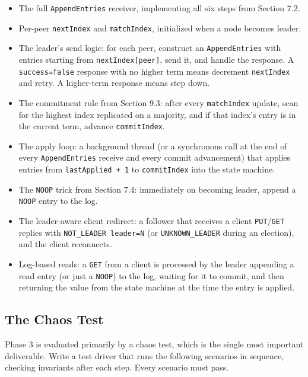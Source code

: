 \documentclass[11pt,a4paper]{article}
\begin{document}
\begin{itemize}
\item The full \texttt{AppendEntries} receiver, implementing all six steps from Section 7.2.

\item Per-peer \texttt{nextIndex} and \texttt{matchIndex}, initialized when a node becomes leader.

\item The leader's send logic: for each peer, construct an \texttt{AppendEntries} with entries starting from \texttt{nextIndex[peer]}, send it, and handle the response. A \texttt{success=false} response with no higher term means decrement \texttt{nextIndex} and retry. A higher-term response means step down.

\item The commitment rule from Section 9.3: after every \texttt{matchIndex} update, scan for the highest index replicated on a majority, and if that index's entry is in the current term, advance \texttt{commitIndex}.

\item The apply loop: a background thread (or a synchronous call at the end of every \texttt{AppendEntries} receive and every commit advancement) that applies entries from \texttt{lastApplied + 1} to \texttt{commitIndex} into the state machine.

\item The \texttt{NOOP} trick from Section 7.4: immediately on becoming leader, append a \texttt{NOOP} entry to the log.

\item The leader-aware client redirect: a follower that receives a client \texttt{PUT}/\texttt{GET} replies with \texttt{NOT\_LEADER leader=N} (or \texttt{UNKNOWN\_LEADER} during an election), and the client reconnects.

\item Log-based reads: a \texttt{GET} from a client is processed by the leader appending a read entry (or just a \texttt{NOOP}) to the log, waiting for it to commit, and then returning the value from the state machine at the time the entry is applied.
\end{itemize}

\subsection{The Chaos Test}
Phase 3 is evaluated primarily by a chaos test, which is the single most important deliverable. Write a test driver that runs the following scenarios in sequence, checking invariants after each step. Every scenario must pass.
\end{document}
